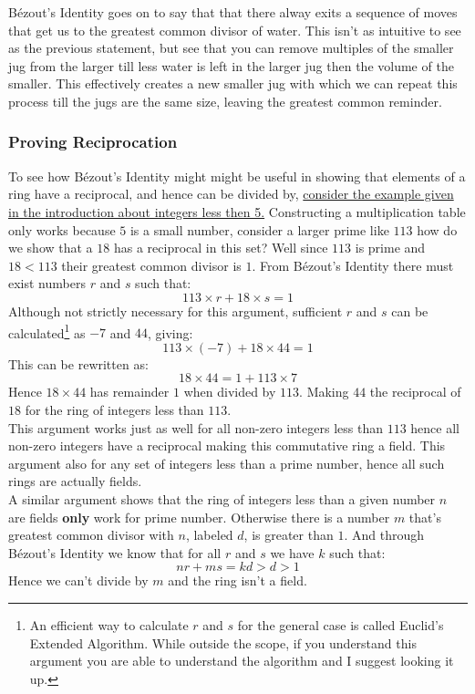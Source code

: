 Bézout's Identity goes on to say that that there alway exits a sequence of moves that get us to the greatest common divisor of water.
This isn't as intuitive to see as the previous statement,
but see that you can remove multiples of the smaller jug from the larger till less water is left in the larger jug then the volume of the smaller.
This effectively creates a new smaller jug with which we can repeat this process till the jugs are the same size,
leaving the greatest common reminder.

\subsubsection{Proving Reciprocation}
To see how Bézout's Identity might might be useful in showing that elements of a ring have a reciprocal,
and hence can be divided by,
\hyperref[intro:gf5]{consider the example given in the introduction about integers less then 5.}
Constructing a multiplication table only works because $5$ is a small number,
consider a larger prime like $113$ how do we show that a $18$ has a reciprocal in this set?
Well since $113$ is prime and $18 < 113$ their greatest common divisor is $1$.
From Bézout's Identity there must exist numbers $r$ and $s$ such that:
\[ 113\times r+18\times s = 1\]
Although not strictly necessary for this argument,
sufficient $r$ and $s$ can be calculated\footnote{
	An efficient way to calculate $r$ and $s$ for the general case is called Euclid's Extended Algorithm. 
	While outside the scope, if you understand this argument you are able to understand the algorithm and I suggest looking it up.} 
as $-7$ and $44$,
giving:
\[ 113\times (-7)+18\times 44 = 1\]
This can be rewritten as:
\[18\times 44 = 1+113\times 7\]
Hence $18\times44$ has remainder $1$ when divided by $113$.
Making $44$ the reciprocal of $18$ for the ring of integers less than $113$.
\\

This argument works just as well for all non-zero integers less than $113$ hence all non-zero integers have a reciprocal making this commutative ring a field.
This argument also for any set of integers less than a prime number, hence all such rings are actually fields.
\\

A similar argument shows that the ring of integers less than a given number $n$ are fields {\bf only} work for prime number.
Otherwise there is a number $m$ that's greatest common divisor with $n$, labeled $d$, is greater than $1$.
And through Bézout's Identity we know that for all $r$ and $s$ we have $k$ such that:
\[ nr+ms = kd > d > 1\]
Hence we can't divide by $m$ and the ring isn't a field.

